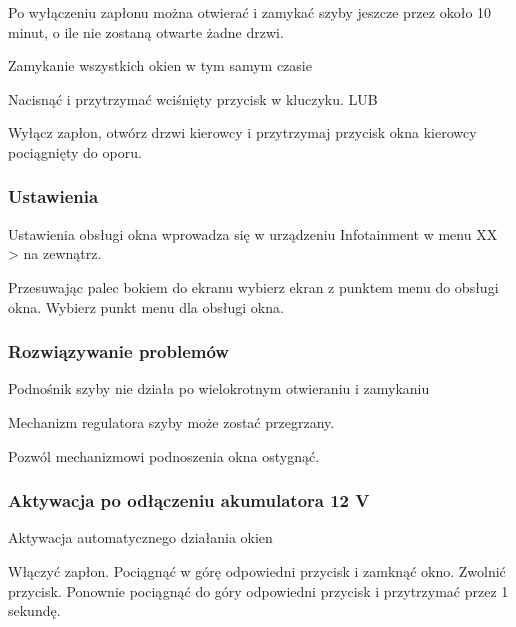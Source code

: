 Po wyłączeniu zapłonu można otwierać i zamykać szyby jeszcze przez około 10 minut, o ile nie zostaną otwarte żadne drzwi.

Zamykanie wszystkich okien w tym samym czasie

Nacisnąć i przytrzymać wciśnięty przycisk w kluczyku.
LUB
\begin{itemizeArrow}
	\itemArrow Wyłącz zapłon, otwórz drzwi kierowcy i przytrzymaj przycisk okna kierowcy pociągnięty do oporu.
\end{itemizeArrow}

\subsubsection{Ustawienia}

Ustawienia obsługi okna wprowadza się w urządzeniu Infotainment w menu XX > na zewnątrz.
\begin{itemizeArrow}
	\itemArrow Przesuwając palec bokiem do ekranu wybierz ekran z punktem menu do obsługi okna.
	\itemArrow Wybierz punkt menu dla obsługi okna.
\end{itemizeArrow}

\subsubsection{Rozwiązywanie problemów}

Podnośnik szyby nie działa po wielokrotnym otwieraniu i zamykaniu

Mechanizm regulatora szyby może zostać przegrzany.

\begin{itemizeArrow}
	\itemArrow Pozwól mechanizmowi podnoszenia okna ostygnąć.
\end{itemizeArrow}


\subsubsection{Aktywacja po odłączeniu akumulatora 12 V}

Aktywacja automatycznego działania okien
\begin{itemizeArrow}
	\itemArrow Włączyć zapłon.
	\itemArrow Pociągnąć w górę odpowiedni przycisk i zamknąć okno.
	\itemArrow Zwolnić przycisk.
	\itemArrow Ponownie pociągnąć do góry odpowiedni przycisk i przytrzymać przez 1 sekundę.
\end{itemizeArrow}


